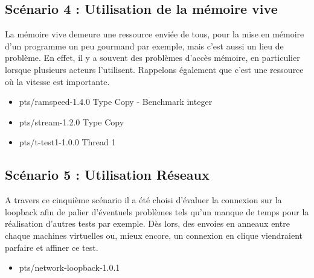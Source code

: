 \subsection{Scénario 4 : Utilisation de la mémoire vive }
La mémoire vive demeure une ressource enviée de tous, pour la mise en mémoire d'un programme un peu gourmand par exemple, mais c'est aussi un lieu de problème. En effet, il y a souvent des problèmes d'accès mémoire, en particulier lorsque plusieurs acteurs l'utilisent. Rappelons également que c'est une ressource où la vitesse est importante. 
\begin{itemize}
\item pts/ramspeed-1.4.0 Type Copy - Benchmark integer
\item pts/stream-1.2.0 Type Copy
\item pts/t-test1-1.0.0 Thread 1
\end{itemize}
\subsection{Scénario 5 : Utilisation Réseaux }
A travers ce cinquième scénario il a été choisi d'évaluer la connexion sur la loopback afin de palier d'éventuels problèmes tels qu'un manque de temps pour la réalisation d'autres tests par exemple. Dès lors, des envoies en anneaux entre chaque machines virtuelles ou, mieux encore, un connexion en clique viendraient parfaire et affiner ce test. 
\begin{itemize}
\item pts/network-loopback-1.0.1
\end{itemize}